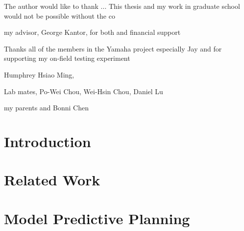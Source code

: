 \documentclass[hidelinks, 12pt]{cmuthesis}
\begin{document}
\begin{acknowledgments}

The author would like to thank ...
This thesis and my work in graduate school would not be possible without the co

my advisor, George Kantor, for both and financial support

Thanks all of the members in the Yamaha project 
especially Jay and 
for supporting my on-field testing experiment


Humphrey
Hsiao Ming, 

Lab mates, Po-Wei Chou, Wei-Hsin Chou, Daniel Lu

my parents and Bonni Chen

\end{acknowledgments}



\tableofcontents
\listoffigures
\listoftables

\mainmatter


%
%
%
%
%


\chapter{Introduction}


\chapter{Related Work} \label{chap:related_work}


\chapter{Model Predictive Planning} \label{chap:rrtplanner}

\end{document}

